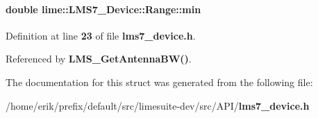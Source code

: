 \paragraph[{min}]{\setlength{\rightskip}{0pt plus 5cm}double lime\+::\+L\+M\+S7\+\_\+\+Device\+::\+Range\+::min}\label{structlime_1_1LMS7__Device_1_1Range_aec8f4af1e85992b8a7cf0a08e60cc2dd}


Definition at line {\bf 23} of file {\bf lms7\+\_\+device.\+h}.



Referenced by {\bf L\+M\+S\+\_\+\+Get\+Antenna\+B\+W()}.



The documentation for this struct was generated from the following file\+:\begin{DoxyCompactItemize}
\item 
/home/erik/prefix/default/src/limesuite-\/dev/src/\+A\+P\+I/{\bf lms7\+\_\+device.\+h}\end{DoxyCompactItemize}
